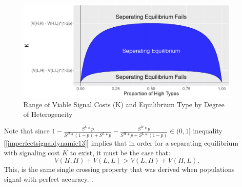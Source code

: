   \begin{figure}[h]
   \caption{Range of Viable Signal Costs (K) and Equilibrium Type by Degree of Heterogeneity}
   \label{fig:Homogeneity}
    \includegraphics[width=\textwidth, height=.28\textheight]{Images/EquilibriumType3.png}
    \end{figure}
 
Note that since $1-\frac{S^L*p}{S^H*(1-p)+S^L*p}-\frac{S^H*p}{S^H*p+S^L*(1-p)} \in (0,1]$ inequality [\ref{imperfectsignaldynamic13}] implies that in order for a separating equilibrium with signaling cost $K$ to exist, it must be the case that: \begin{equation}
     V(H,H)+V(L,L)>V(L,H)+V(H,L).
 \end{equation}
 This, is the same single crossing property that was derived when populations signal with perfect accuracy. \citep{Zahavi1975, Spence1973}.

